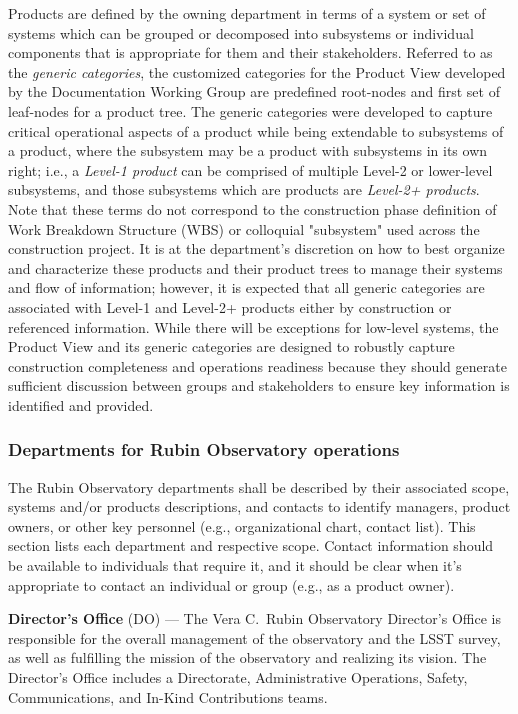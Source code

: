 Products are defined by the owning department in terms of a system or set of systems which can be grouped or decomposed into subsystems or individual components that is appropriate for them and their stakeholders.
Referred to as the \emph{generic categories}, the customized categories for the Product View developed by the Documentation Working Group are predefined root-nodes and first set of leaf-nodes for a product tree.
The generic categories were developed to capture critical operational aspects of a product while being extendable to subsystems of a product, where the subsystem may be a product with subsystems in its own right; i.e., a \emph{Level-1 product} can be comprised of multiple Level-2 or lower-level subsystems, and those subsystems which are products are \emph{Level-2+ products}.
Note that these terms do not correspond to the construction phase definition of Work Breakdown Structure (WBS) or colloquial "subsystem" used across the construction project.
It is at the department's discretion on how to best organize and characterize these products and their product trees to manage their systems and flow of information; however, it is expected that all generic categories are associated with Level-1 and Level-2+ products either by construction or referenced information.
While there will be exceptions for low-level systems, the Product View and its generic categories are designed to robustly capture construction completeness and operations readiness because they should generate sufficient discussion between groups and stakeholders to ensure key information is identified and provided.

\subsubsection{Departments for Rubin Observatory operations}

The Rubin Observatory departments shall be described by their associated scope, systems and/or products descriptions, and contacts to identify managers, product owners, or other key personnel (e.g., organizational chart, contact list).
This section lists each department and respective scope.
Contact information should be available to individuals that require it, and it should be clear when it's appropriate to contact an individual or group (e.g., as a product owner).

\textbf{Director's Office} (DO) ---
The Vera C.\ Rubin Observatory Director's Office is responsible for the overall management of the observatory and the LSST survey, as well as fulfilling the mission of the observatory and realizing its vision.
The Director's Office includes a Directorate, Administrative Operations, Safety, Communications, and In-Kind Contributions teams.

